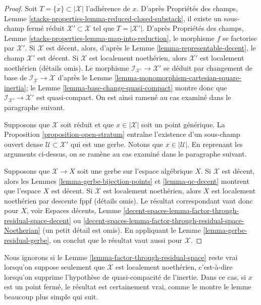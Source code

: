 \begin{proof}
Soit $T = \overline{\{x\}} \subset |\mathcal{X}|$ l'adh\'erence de $x$.
D'apr\`es Propri\'et\'es des champs, Lemme
\ref{stacks-properties-lemma-reduced-closed-substack},
il existe un sous-champ ferm\'e r\'eduit $\mathcal{X}' \subset \mathcal{X}$
tel que $T = |\mathcal{X}'|$. D'apr\`es Propri\'et\'es des champs, Lemme
\ref{stacks-properties-lemma-map-into-reduction}, le
morphisme $f$ se factorise par $\mathcal{X}'$. Si $\mathcal{X}$ est d\'ecent,
alors, d'apr\`es le Lemme \ref{lemma-representable-decent}, le champ
$\mathcal{X}'$ est d\'ecent. Si $\mathcal{X}$ est localement noeth\'erien,
alors $\mathcal{X}'$ est localement noeth\'erien (d\'etails omis).
Le morphisme $\mathcal{I}_{\mathcal{X}'} \to \mathcal{X}'$
se d\'eduit par changement de base de $\mathcal{I}_\mathcal{X} \to \mathcal{X}$ d'apr\`es le
Lemme \ref{lemma-monomorphism-cartesian-square-inertia};
le Lemme \ref{lemma-base-change-quasi-compact} montre donc que
$\mathcal{I}_{\mathcal{X}'} \to \mathcal{X}'$ est quasi-compact.
On est ainsi ramen\'e au cas examin\'e dans le paragraphe suivant.

\medskip\noindent
Supposons que $\mathcal{X}$ soit r\'eduit et que $x \in |\mathcal{X}|$
soit un point g\'en\'erique. La Proposition \ref{proposition-open-stratum}
entra\^ine l'existence d'un sous-champ ouvert dense
$\mathcal{U} \subset \mathcal{X}'$ qui est une gerbe.
Notons que $x \in |\mathcal{U}|$.
En reprenant les arguments ci-dessus, on se ram\`ene au cas examin\'e
dans le paragraphe suivant.

\medskip\noindent
Supposons que $\mathcal{X} \to X$ soit une gerbe sur l'espace alg\'ebrique $X$.
Si $\mathcal{X}$ est d\'ecent, alors les
Lemmes \ref{lemma-gerbe-bijection-points} et \ref{lemma-qc-decent}
montrent que l'espace $X$ est d\'ecent. Si $\mathcal{X}$ est localement noeth\'erien,
alors $X$ est localement noeth\'erien par descente fppf (d\'etails omis).
Le r\'esultat correspondant vaut donc pour $X$, voir Espaces d\'ecents, Lemme
\ref{decent-spaces-lemma-factor-through-residual-space-decent} ou
\ref{decent-spaces-lemma-factor-through-residual-space-Noetherian}
(un petit d\'etail est omis).
En appliquant le Lemme \ref{lemma-gerbe-residual-gerbe}, on conclut que le r\'esultat
vaut aussi pour $\mathcal{X}$.
\end{proof}

\begin{remark}
\label{lemma-factor-through-residual-space-Noetherian}
Nous ignorons si le Lemme \ref{lemma-factor-through-residual-space}
reste vrai lorsqu'on suppose seulement que $\mathcal{X}$ est localement noeth\'erien,
c'est-\`a-dire lorsqu'on supprime l'hypoth\`ese de quasi-compacit\'e de l'inertie. Dans ce cas,
si $x$ est un point ferm\'e, le r\'esultat est certainement vrai, comme le montre le
lemme beaucoup plus simple qui suit.
\end{remark}

